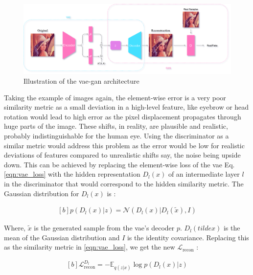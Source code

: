 \begin{figure}[!h]
    \centering
    \includegraphics[scale=0.15]{figures/arch/vae_gan_arch.png}
    \caption{Illustration of the \ac{vae}-\ac{gan} architecture}
    \label{fig:vae_gan_arch}
\end{figure}


Taking the example of images again, the element-wise error is a very poor similarity metric as a small deviation in a high-level feature, like eyebrow or head rotation would lead to high error as the pixel displacement propagates through huge parts of the image. These shifts, in reality, are plausible and realistic, probably indistinguishable for the human eye. Using the discriminator as a similar metric would address this problem as the error would be low for realistic deviations of features compared to unrealistic shifts say, the noise being upside down. This can be achieved by replacing the element-wise loss of the \ac{vae} Eq. \ref{eqn:vae_loss} with the hidden representation $D_{l}(x)$ of an intermediate layer $l$ in the discriminator that would correspond to the hidden similarity metric. The Gaussian distribution for $D_{l}(x)$ is :

\begin{equation} \label{eqn:gan_similarity}
    \begin{aligned}[b]
        p\left(D_{l}(x) | z\right)=\mathcal{N}\left(D_{l}(x) | D_{l}(\tilde{x}), I\right)
    \end{aligned}
\end{equation}

Where, $\tilde{x}$ is the generated sample from the \ac{vae}'s decoder $p$. $D_{l}(tilde{x})$ is the mean of the Gaussian distribution and $I$ is the identity covariance. Replacing this as the similarity metric in \ref{eqn:vae_loss}, we get the new $\mathcal{L}_{\text {recon}}$ :

\begin{equation} \label{eqn:vaegan_recon}
    \begin{gathered}[b]
        \mathcal{L}_{\text {recon}}^{D_{l}}=-\mathbb{E}_{q(z | x)} \log p\left(D_{l}(x) | z\right)
    \end{gathered}
\end{equation}

